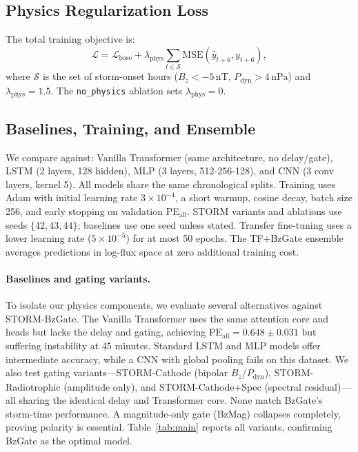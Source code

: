 \documentclass[conference]{IEEEtran}
\begin{document}
\subsection{Physics Regularization Loss}
The total training objective is:
\begin{equation}
\mathcal{L} = \mathcal{L}_{\mathrm{base}} + \lambda_{\mathrm{phys}}
\sum_{t\in\mathcal{S}}\mathrm{MSE}(\hat{y}_{t+6},y_{t+6}),
\end{equation}
where \(\mathcal{S}\) is the set of storm-onset hours (\(B_z<-5\,\mathrm{nT}\),
\(P_{\mathrm{dyn}}>4\,\mathrm{nPa}\)) and \(\lambda_{\mathrm{phys}}=1.5\).
The \texttt{no\_physics} ablation sets \(\lambda_{\mathrm{phys}}=0\).

\subsection{Baselines, Training, and Ensemble}
We compare against: Vanilla Transformer (same architecture, no delay/gate),
LSTM (2 layers, 128 hidden), MLP (3 layers, 512-256-128), and CNN (3 conv
layers, kernel 5). All models share the same chronological splits. Training
uses Adam with initial learning rate \(3\times10^{-4}\), a short warmup,
cosine decay, batch size 256, and early stopping on validation
PE\(_\mathrm{all}\). STORM variants and ablations use seeds \(\{42,43,44\}\);
baselines use one seed unless stated. Transfer fine-tuning uses a lower
learning rate (\(5\times10^{-5}\)) for at most 50 epochs. The TF+BzGate
ensemble averages predictions in log-flux space at zero additional training
cost.

\paragraph{Baselines and gating variants.}
To isolate our physics components, we evaluate several alternatives against STORM-BzGate. The Vanilla Transformer uses the same attention core and heads but lacks the delay and gating, achieving $\mathrm{PE}_{\mathrm{all}}=0.648\pm0.031$ but suffering instability at 45 minutes. Standard LSTM and MLP models offer intermediate accuracy, while a CNN with global pooling fails on this dataset. We also test gating variants—STORM-Cathode (bipolar $B_z$/$P_{\mathrm{dyn}}$), STORM-Radiotrophic (amplitude only), and STORM-Cathode+Spec (spectral residual)—all sharing the identical delay and Transformer core. None match BzGate's storm-time performance. A magnitude-only gate (BzMag) collapses completely, proving polarity is essential. Table~\ref{tab:main} reports all variants, confirming BzGate as the optimal model.
\end{document}
